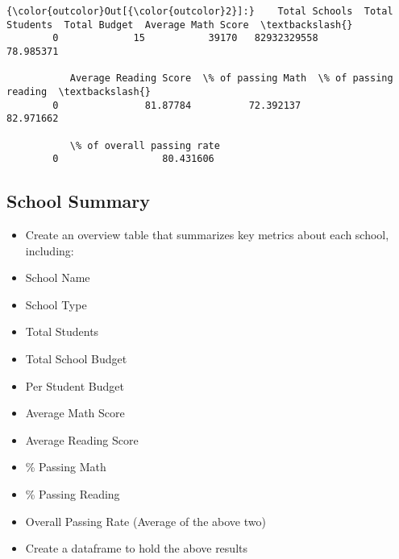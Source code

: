 \documentclass[11pt]{article}
\begin{document}
\begin{Verbatim}[commandchars=\\\{\}]
{\color{outcolor}Out[{\color{outcolor}2}]:}    Total Schools  Total Students  Total Budget  Average Math Score  \textbackslash{}
        0             15           39170   82932329558           78.985371   
        
           Average Reading Score  \% of passing Math  \% of passing reading  \textbackslash{}
        0               81.87784          72.392137             82.971662   
        
           \% of overall passing rate  
        0                  80.431606  
\end{Verbatim}
            
    \subsection{School Summary}\label{school-summary}

    \begin{itemize}
\item
  Create an overview table that summarizes key metrics about each
  school, including:
\item
  School Name
\item
  School Type
\item
  Total Students
\item
  Total School Budget
\item
  Per Student Budget
\item
  Average Math Score
\item
  Average Reading Score
\item
  \% Passing Math
\item
  \% Passing Reading
\item
  Overall Passing Rate (Average of the above two)
\item
  Create a dataframe to hold the above results
\end{itemize}
\end{document}
